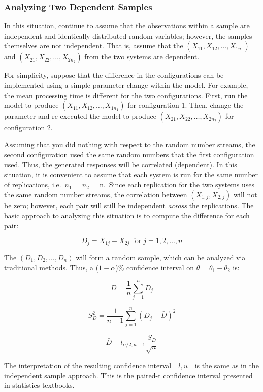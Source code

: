 \documentclass[
]{book}
\theoremstyle{definition}
\theoremstyle{definition}
\theoremstyle{definition}
\theoremstyle{definition}
\theoremstyle{remark}
\begin{document}
\hypertarget{simoa:comparingSystems:twoDep}{%
\subsubsection{Analyzing Two Dependent Samples}\label{simoa:comparingSystems:twoDep}}

In this situation, continue to assume that the observations within a
sample are independent and identically distributed random variables;
however, the samples themselves are not independent. That is, assume
that the \((X_{11}, X_{12},\ldots, X_{1n_1})\) and \((X_{21}, X_{22}, \ldots, X_{2n_2})\) from the
two systems are dependent.

For simplicity, suppose that the difference in the configurations can be
implemented using a simple parameter change within the model. For
example, the mean processing time is different for the two
configurations. First, run the model to produce
\((X_{11}, X_{12}, \ldots, X_{1n_1})\) for configuration 1. Then, change
the parameter and re-executed the model to produce
\((X_{21}, X_{22}, \ldots, X_{2n_2})\) for configuration 2.

Assuming that you did nothing with respect to the random number streams,
the second configuration used the same random numbers that the first
configuration used. Thus, the generated responses will be correlated
(dependent). In this situation, it is convenient to assume that each
system is run for the same number of replications, i.e.~\(n_1\) = \(n_2\) =
n.~Since each replication for the two systems uses the same random
number streams, the correlation between \((X_{1,j}, X_{2,j})\) will not be
zero; however, each pair will still be independent \emph{across} the
replications. The basic approach to analyzing this situation is to
compute the difference for each pair:

\[D_j = X_{1j} - X_{2j} \ \ \text{for} \; j = 1,2,\ldots,n\]

The \((D_1, D_2, \ldots, D_n)\) will form a random sample, which can be
analyzed via traditional methods. Thus, a (\(1 - \alpha\))\% confidence
interval on \(\theta = \theta_1 - \theta_2\) is:

\[\bar{D} = \dfrac{1}{n} \sum_{j=1}^n D_j\]

\[S_D^2 = \dfrac{1}{n-1} \sum_{j=1}^n (D_j - \bar{D})^2\]

\[\bar{D} \pm t_{\alpha/2, n-1} \dfrac{S_D}{\sqrt{n}}\]

The interpretation of the resulting confidence interval \([l, u]\) is the
same as in the independent sample approach. This is the paired-t
confidence interval presented in statistics textbooks.
\end{document}
